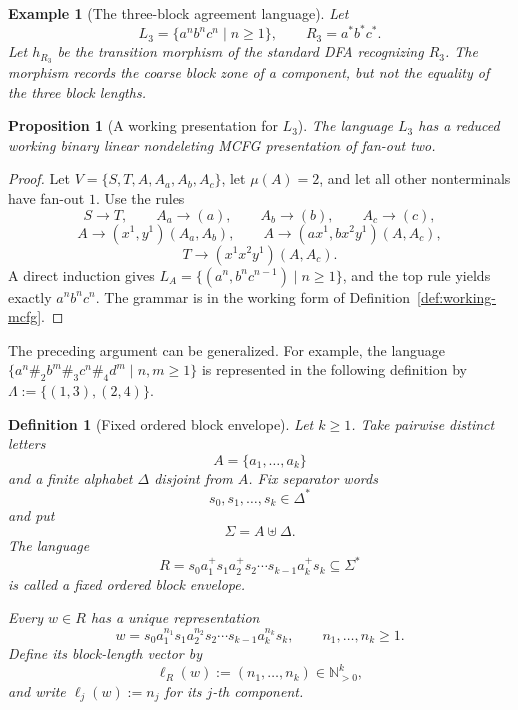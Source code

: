 \documentclass[11pt,a4paper]{article}
\newtheorem{proposition}[theorem]{Proposition}
\newtheorem{definition}[theorem]{Definition}
\newtheorem{example}[theorem]{Example}
\theoremstyle{remark}
\begin{document}
\begin{example}[The three-block agreement language]
\label{ex:l3-language}
Let
\[
  L_3=\{a^n b^n c^n\mid n\ge1\},
  \qquad R_3=a^*b^*c^* .
\]
Let \(h_{R_3}\) be the transition morphism of the standard DFA recognizing
\(R_3\).  The morphism records the coarse block zone of a component, but not the
equality of the three block lengths.
\end{example}

\begin{proposition}[A working presentation for \(L_3\)]
\label{prop:l3-running-example}
The language \(L_3\) has a reduced working binary linear nondeleting MCFG
presentation of fan-out two.
\end{proposition}

\begin{proof}
Let \(V=\{S,T,A,A_a,A_b,A_c\}\), let \(\mu(A)=2\), and let all other
nonterminals have fan-out \(1\).  Use the rules
\[
  S\to T,\qquad A_a\to(a),\qquad A_b\to(b),\qquad A_c\to(c),
\]
\[
  A\to(x^1,y^1)(A_a,A_b),\qquad
  A\to(a x^1,b x^2 y^1)(A,A_c),
\]
\[
  T\to(x^1x^2y^1)(A,A_c).
\]
A direct induction gives
\(L_A=\{(a^n,b^n c^{n-1})\mid n\ge1\}\), and the top rule yields exactly
\(a^n b^n c^n\).  The grammar is in the working form of
Definition~\ref{def:working-mcfg}.
\end{proof}

The preceding argument can be generalized.  For example, the language
\(\{a^n\#_2b^m\#_3c^n\#_4d^m\mid n,m\ge1\}\) is represented in the following
definition by \(\Lambda:=\{(1,3),(2,4)\}\).

\begin{definition}[Fixed ordered block envelope]
\label{def:fixed-ordered-block-envelope}
Let \(k\ge1\).  Take pairwise distinct letters
\[
  A=\{a_1,\ldots,a_k\}
\]
and a finite alphabet \(\Delta\) disjoint from \(A\).  Fix separator words
\[
  s_0,s_1,\ldots,s_k\in\Delta^*
\]
and put
\[
  \Sigma=A\uplus\Delta.
\]
The language
\[
  R
  =
  s_0a_1^+s_1a_2^+s_2\cdots s_{k-1}a_k^+s_k
  \subseteq\Sigma^*
\]
is called a \emph{fixed ordered block envelope}.

Every \(w\in R\) has a unique representation
\[
  w
  =
  s_0a_1^{n_1}s_1a_2^{n_2}s_2
  \cdots
  s_{k-1}a_k^{n_k}s_k,
  \qquad
  n_1,\ldots,n_k\ge1.
\]
Define its block-length vector by
\[
  \ell_R(w)
  :=
  (n_1,\ldots,n_k)
  \in\mathbb N_{>0}^k,
\]
and write \(\ell_j(w):=n_j\) for its \(j\)-th component.
\end{definition}
\end{document}
